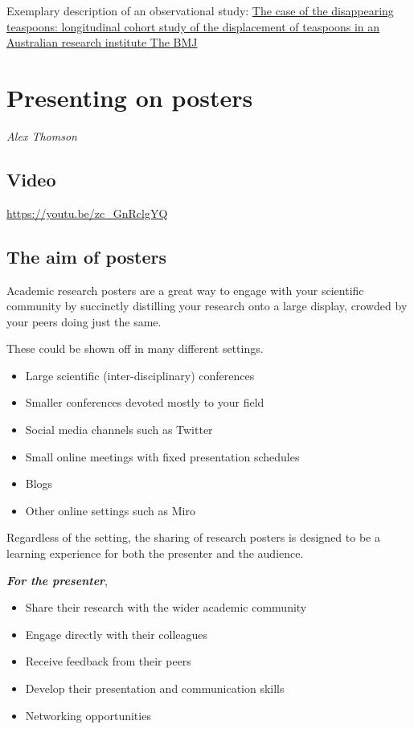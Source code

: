 \documentclass[
  titlepage]{book}
\providecommand{\tightlist}{%
  \setlength{\itemsep}{0pt}\setlength{\parskip}{0pt}}
\begin{document}
Exemplary description of an observational study: \href{https://www.bmj.com/content/331/7531/1498}{The case of the disappearing teaspoons: longitudinal cohort study of the displacement of teaspoons in an Australian research institute \textbar{} The BMJ}

\hypertarget{posters}{%
\chapter{Presenting on posters}\label{posters}}

\emph{Alex Thomson}

\hypertarget{video-4}{%
\section{Video}\label{video-4}}

\label{fig:unnamed-chunk-37}\url{https://youtu.be/zc_GnRclgYQ}

\hypertarget{the-aim-of-posters}{%
\section{The aim of posters}\label{the-aim-of-posters}}

Academic research posters are a great way to engage with your scientific community by succinctly distilling your research onto a large display, crowded by your peers doing just the same.

These could be shown off in many different settings.

\begin{itemize}
\tightlist
\item
  Large scientific (inter-disciplinary) conferences
\item
  Smaller conferences devoted mostly to your field
\item
  Social media channels such as Twitter
\item
  Small online meetings with fixed presentation schedules
\item
  Blogs
\item
  Other online settings such as Miro
\end{itemize}

Regardless of the setting, the sharing of research posters is designed to be a learning experience for both the presenter and the audience.

\textbf{\emph{For the presenter}},

\begin{itemize}
\tightlist
\item
  Share their research with the wider academic community
\item
  Engage directly with their colleagues
\item
  Receive feedback from their peers
\item
  Develop their presentation and communication skills
\item
  Networking opportunities
\end{itemize}
\end{document}

